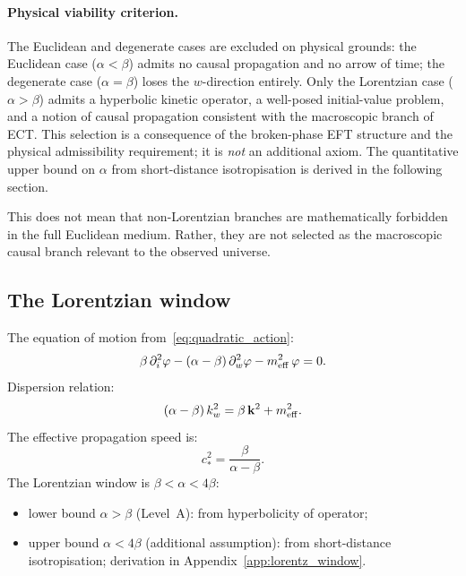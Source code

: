 \documentclass[11pt,a4paper]{article}
\numberwithin{equation}{section}
\begin{document}
\paragraph{Physical viability criterion.}
The Euclidean and degenerate cases are excluded on physical grounds:
the Euclidean case ($\alpha<\beta$) admits no causal propagation and
no arrow of time; the degenerate case ($\alpha=\beta$) loses the
$w$-direction entirely.  Only the Lorentzian case ($\alpha>\beta$)
admits a hyperbolic kinetic operator, a well-posed initial-value
problem, and a notion of causal propagation consistent with the
macroscopic branch of ECT.  This selection is a consequence of the
broken-phase EFT structure and the physical admissibility requirement;
it is \emph{not} an additional axiom.  The quantitative upper bound
on $\alpha$ from short-distance isotropisation is derived in
the following section.

This does not mean that non-Lorentzian branches are mathematically
forbidden in the full Euclidean medium. Rather, they are not selected
as the macroscopic causal branch relevant to the observed universe.

\subsection{The Lorentzian window}
\label{sec:lorentz_window}

The equation of motion from~\eqref{eq:quadratic_action}:
\begin{equation}
  \label{eq:eom_broken}
  \beta\,\partial_i^2\varphi
  - (\alpha-\beta)\,\partial_w^2\varphi
  - m_{\rm eff}^2\,\varphi = 0.
\end{equation}
Dispersion relation:
\begin{equation}
  \label{eq:dispersion}
  (\alpha-\beta)\,k_w^2 = \beta\,\mathbf{k}^2 + m_{\rm eff}^2.
\end{equation}
The effective propagation speed is:
\begin{equation}
  \label{eq:c_star_general}
  c_*^2 = \frac{\beta}{\alpha-\beta}.
\end{equation}
The Lorentzian window is $\beta < \alpha < 4\beta$:
\begin{itemize}
  \item lower bound $\alpha>\beta$ (Level~A): from hyperbolicity of operator;
  \item upper bound $\alpha<4\beta$ (additional assumption):
    from short-distance isotropisation;
    derivation in Appendix~\ref{app:lorentz_window}.
\end{itemize}
\end{document}
